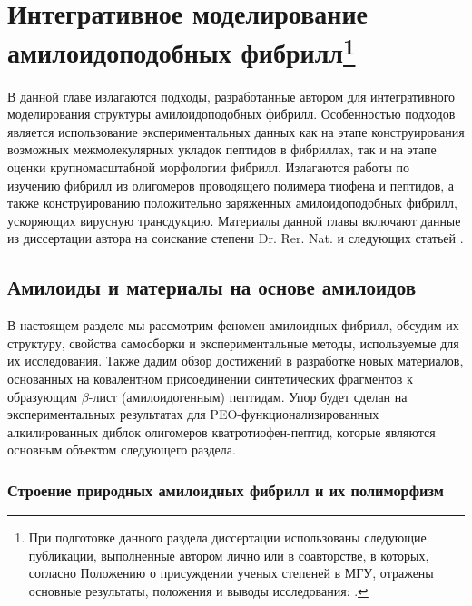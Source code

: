 \chapter[Интегративное моделирование амилоидоподобных фибрилл]{Интегративное моделирование амилоидоподобных фибрилл\footnote{При подготовке данного раздела диссертации использованы следующие публикации, выполненные автором лично или в соавторстве, в которых, согласно Положению о присуждении ученых степеней в МГУ, отражены основные результаты, положения и выводы исследования: \cite{shaytan_self-assembling_2011,shaytan_self-organizing_2011,yolamanova_peptide_2013}.}}  \label{part4_amyloid}


В данной главе излагаются подходы, разработанные автором для интегративного моделирования структуры амилоидоподобных фибрилл. Особенностью подходов является использование экспериментальных данных как на этапе конструирования возможных межмолекулярных укладок пептидов в фибриллах, так и на этапе оценки крупномасштабной морфологии фибрилл. Излагаются работы по изучению фибрилл из олигомеров проводящего полимера тиофена и пептидов, а также конструированию положительно заряженных амилоидоподобных фибрилл, ускоряющих вирусную трансдукцию.
Материалы данной главы включают данные из диссертации автора на соискание степени Dr. Rer. Nat. \cite{shaytan_thesis_ulm_2012} и следующих статьей \cite{shaytan_self-assembling_2011,shaytan_self-organizing_2011,yolamanova_peptide_2013}. 


\section{Амилоиды и материалы на основе амилоидов}

    В настоящем разделе мы рассмотрим феномен амилоидных фибрилл, обсудим их структуру, свойства самосборки и экспериментальные методы, используемые для их исследования. Также дадим обзор достижений в разработке новых материалов, основанных на ковалентном присоединении синтетических фрагментов к образующим $\beta$-лист (амилоидогенным) пептидам. Упор будет сделан на экспериментальных результатах для PEO-функционализированных алкилированных  диблок олигомеров кватротиофен-пептид, которые являются основным объектом следующего раздела.

\subsection{Строение природных амилоидных фибрилл и их полиморфизм}

